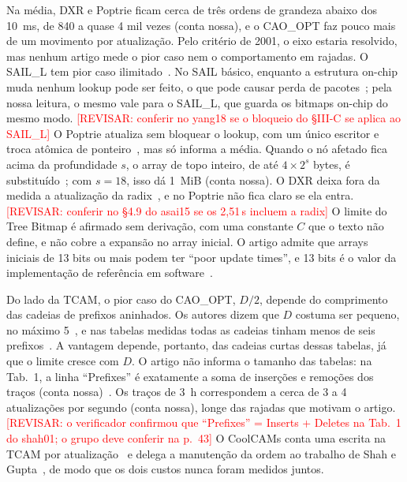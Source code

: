 \documentclass[conference,a4paper]{IEEEtran}
\newcommand{\revisar}[1]{\textcolor{red}{[REVISAR: #1]}}
\newcommand{\us}{\,\textmu s}
\begin{document}
Na média, DXR e Poptrie ficam cerca de três ordens de grandeza abaixo dos 10~ms, de 840 a quase 4 mil vezes (conta
nossa), e o CAO\_OPT faz pouco mais de um movimento por atualização. Pelo critério de 2001, o eixo estaria resolvido, mas
nenhum artigo mede o pior caso nem o comportamento em rajadas. O SAIL\_L tem pior caso ilimitado~\cite[Tab.~II,
\S IV-E]{yang18}. No SAIL básico, enquanto a estrutura on-chip muda nenhum lookup pode ser feito, o que pode causar perda de
pacotes~\cite[\S III-C]{yang18}; pela nossa leitura, o mesmo vale para o SAIL\_L, que guarda os bitmaps on-chip do mesmo
modo. \revisar{conferir no yang18 se o bloqueio do \S III-C se aplica ao SAIL\_L} O Poptrie atualiza sem bloquear o
lookup, com um único escritor e troca atômica de ponteiro~\cite[\S3.5]{asai15}, mas só informa a média. Quando o nó afetado
fica acima da profundidade $s$, o array de topo inteiro, de até $4\times2^s$ bytes, é substituído~\cite[\S3.4--3.5]{asai15};
com $s=18$, isso dá 1~MiB (conta nossa). O DXR deixa fora da medida a atualização da radix~\cite[\S4.4]{zec12}, e no
Poptrie não fica claro se ela entra. \revisar{conferir no \S4.9 do asai15 se os 2,51\us{} incluem a radix} O limite do
Tree Bitmap é afirmado sem derivação, com uma constante $C$ que o texto não define, e não cobre a expansão no array
inicial. O artigo admite que arrays iniciais de 13 bits ou mais podem ter ``poor update times'', e 13 bits é o valor da
implementação de referência em software~\cite[\S4, \S5.1, \S6]{eath04}.

Do lado da TCAM, o pior caso do CAO\_OPT, $D/2$, depende do comprimento das cadeias de prefixos aninhados. Os autores
dizem que $D$ costuma ser pequeno, no máximo 5~\cite[p.~40]{shah01}, e nas tabelas medidas todas as cadeias tinham menos
de seis prefixos~\cite[p.~44, Fig.~15]{shah01}. A vantagem depende, portanto, das cadeias curtas dessas tabelas, já que o
limite cresce com $D$. O artigo não informa o tamanho das tabelas: na Tab.~1, a linha ``Prefixes'' é exatamente a soma de
inserções e remoções dos traços (conta nossa)~\cite[Tab.~1]{shah01}. Os traços de 3~h correspondem a cerca de 3 a 4
atualizações por segundo (conta nossa), longe das rajadas que motivam o artigo. \revisar{o verificador confirmou que
``Prefixes'' = Inserts + Deletes na Tab.~1 do shah01; o grupo deve conferir na p.~43} O CoolCAMs conta uma escrita na TCAM
por atualização~\cite[\S V, Tab.~IV]{zane03} e delega a manutenção da ordem ao trabalho de Shah e
Gupta~\cite[\S II]{zane03}, de modo que os dois custos nunca foram medidos juntos.
\end{document}
